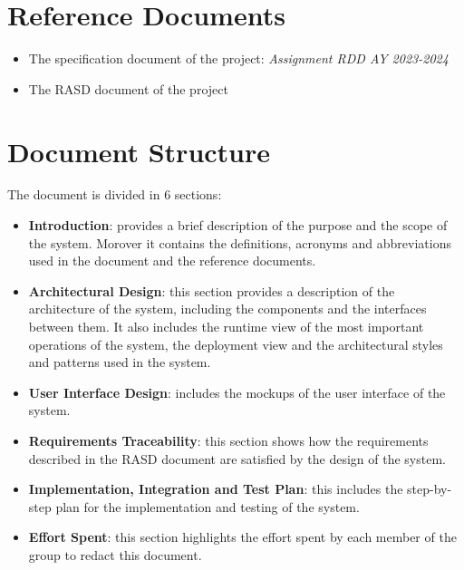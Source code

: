 \section{Reference Documents}
\label{s:reference-documents}%

\begin{itemize}
  \item The specification document of the project: \textit{Assignment RDD AY 2023-2024}
  \item The RASD document of the project
\end{itemize}


\section{Document Structure}
\label{s:document-structure}%

The document is divided in 6 sections:
\begin{itemize}
  \item \textbf{Introduction}: provides a brief description of the purpose and the scope of the system. Morover it contains the definitions, acronyms and abbreviations used in the document and the reference documents.
  \item \textbf{Architectural Design}: this section provides a description of the architecture of the system, including the components and the interfaces between them. It also includes the runtime view of the most important operations of the system, the deployment view and the architectural styles and patterns used in the system. 
  \item \textbf{User Interface Design}: includes the mockups of the user interface of the system.
  \item \textbf{Requirements Traceability}: this section shows how the requirements described in the RASD document are satisfied by the design of the system. 
  \item \textbf{Implementation, Integration and Test Plan}: this includes the step-by-step plan for the implementation and testing of the system.
  \item \textbf{Effort Spent}: this section highlights the effort spent by each member of the group to redact this document.
\end{itemize}
